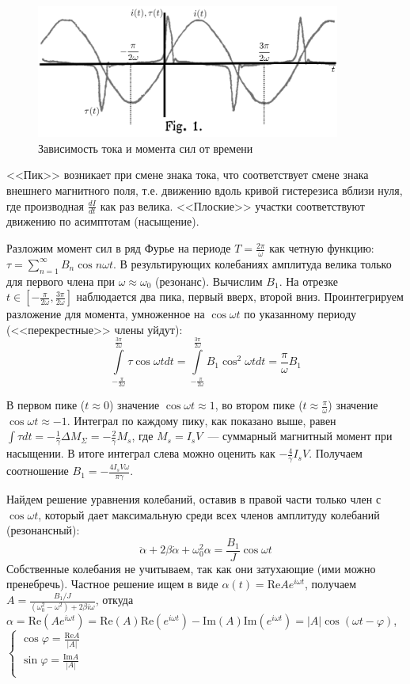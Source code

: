 \documentclass[a4paper]{article}
\begin{document}
\begin{figure}[H]
	\centering
	\includegraphics[width=10cm]{fig1.png}
	\caption{Зависимость тока и момента сил от времени}
\end{figure}
<<Пик>> возникает при смене знака тока, что соответствует смене знака внешнего магнитного поля, т.е. движению вдоль кривой гистерезиса вблизи нуля, где производная $\frac{dI}{dt}$ как раз велика. <<Плоские>> участки соответствуют движению по асимптотам (насыщение).

Разложим момент сил в ряд Фурье на периоде $T=\frac{2\pi}{\omega}$ как четную функцию: $\tau=\sum\limits_{n=1}^{\infty}B_n\cos n\omega t$. В результирующих колебаниях амплитуда велика только для первого члена при $\omega\approx\omega_0$ (резонанс). Вычислим $B_1$. На отрезке $t\in[-\frac{\pi}{2\omega},\frac{3\pi}{2\omega}]$ наблюдается два пика, первый вверх, второй вниз. Проинтегрируем разложение для момента, умноженное на $\cos\omega t$ по указанному периоду (<<перекрестные>> члены уйдут): $$\int\limits_{-\frac{\pi}{2\omega}}^{\frac{3\pi}{2\omega}}\tau\cos\omega tdt=\int\limits_{-\frac{\pi}{2\omega}}^{\frac{3\pi}{2\omega}}B_1\cos^2\omega tdt=\frac{\pi}{\omega}B_1$$

В первом пике ($t\approx0$) значение $\cos\omega t\approx 1$, во втором пике ($t\approx \frac{\pi}{\omega}$) значение $\cos\omega t\approx -1$. Интеграл по каждому пику, как показано выше, равен $\int \tau dt=-\frac{1}{\gamma}\Delta M_\Sigma=-\frac{2}{\gamma}M_s$, где $M_s=I_sV$~--- суммарный магнитный момент при насыщении. В итоге интеграл слева можно оценить как $-\frac{4}{\gamma}I_sV$. Получаем соотношение $B_1=-\frac{4I_sV\omega}{\pi\gamma}$.

Найдем решение уравнения колебаний, оставив в правой части только член с $\cos\omega t$, который дает максимальную среди всех членов амплитуду колебаний (резонансный):
$$
\ddot{\alpha}+2\beta\dot{\alpha}+\omega_0^2\alpha=\frac{B_1}{J}\cos\omega t
$$
Собственные колебания не учитываем, так как они затухающие (ими можно пренебречь). Частное решение ищем в виде $\alpha(t)=\mbox{Re} Ae^{i\omega t}$, получаем $A=\frac{B_1/J}{(\omega_0^2-\omega^2)+2\beta i\omega}$, откуда $\alpha=\mbox{Re}(Ae^{i\omega t})=\mbox{Re}(A)\mbox{Re}(e^{i\omega t})-\mbox{Im}(A)\mbox{Im}(e^{i\omega t})=|A|\cos(\omega t-\varphi)$, $\begin{cases}
\cos\varphi=\frac{\mbox{Re}A}{|A|}\\
\sin\varphi=\frac{\mbox{Im}A}{|A|}\\
\end{cases}$
\end{document}
